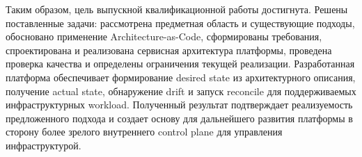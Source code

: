 Таким образом, цель выпускной квалификационной работы достигнута. Решены поставленные задачи: рассмотрена предметная область и существующие подходы, обосновано применение Architecture-as-Code, сформированы требования, спроектирована и реализована сервисная архитектура платформы, проведена проверка качества и определены ограничения текущей реализации. Разработанная платформа обеспечивает формирование desired state из архитектурного описания, получение actual state, обнаружение drift и запуск reconcile для поддерживаемых инфраструктурных workload. Полученный результат подтверждает реализуемость предложенного подхода и создает основу для дальнейшего развития платформы в сторону более зрелого внутреннего control plane для управления инфраструктурой.
